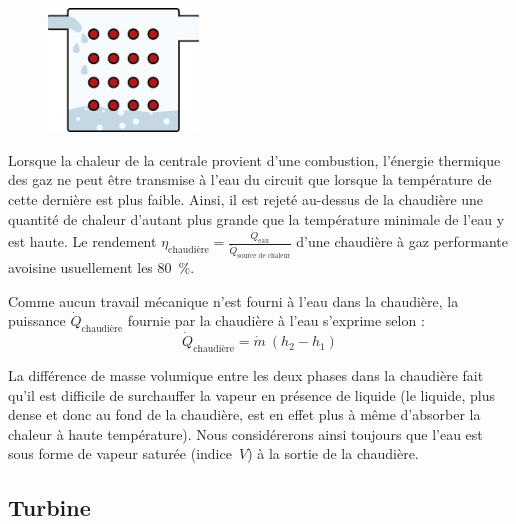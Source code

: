 		\begin{figure}
			\begin{center}
				\includegraphics[width=4cm]{images/symbole_chaudiere.png}
			\end{center}
			\label{fig_centrale_chaudiere2}
		\end{figure}
		
		Lorsque la chaleur de la centrale provient d’une combustion, l’énergie thermique des gaz ne peut être transmise à l’eau du circuit que lorsque la température de cette dernière est plus faible. Ainsi, il est rejeté au-dessus de la chaudière une quantité de chaleur d’autant plus grande que la température minimale de l’eau y est haute. Le rendement $\eta_\text{chaudière} = \frac{\dot Q_\text{eau}}{\dot Q_\text{source de chaleur}}$ d’une chaudière à gaz performante avoisine usuellement les \SI{80}{\percent}.

		Comme aucun travail mécanique n’est fourni à l’eau dans la chaudière, la puissance $\dot{Q}_\text{chaudière}$ fournie par la chaudière à l’eau s’exprime selon :
		\begin{equation}
			\dot{Q}_\text{chaudière} = \dot{m} \ (h_2 - h_1)
		\end{equation}

		La différence de masse volumique entre les deux phases dans la chaudière fait qu’il est difficile de surchauffer la vapeur en présence de liquide (le liquide, plus dense et donc au fond de la chaudière, est en effet plus à même d’absorber la chaleur à haute température). Nous considérerons ainsi toujours que l’eau est sous forme de vapeur saturée (indice~$V$) à la sortie de la chaudière.


	\subsection{Turbine}

